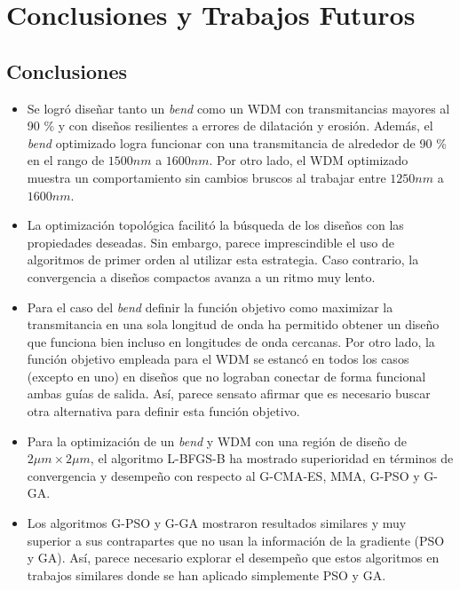 \chapter{Conclusiones y Trabajos Futuros}\label{chapter:conclutions}

\section{Conclusiones}

\begin{itemize}

  \item Se logró diseñar tanto un \emph{bend} como un WDM con transmitancias mayores al 90 \% y
        con diseños resilientes a errores de dilatación y erosión.
        Además, el \emph{bend} optimizado logra funcionar con una transmitancia de alrededor de 90 \%
        en el rango de $1500nm$ a $1600 nm$. Por otro lado, el WDM optimizado muestra un comportamiento
        sin cambios bruscos al trabajar entre $1250 nm$ a $1600 nm$.

  \item La optimización topológica facilitó la búsqueda de los diseños con las propiedades deseadas.
        Sin embargo, parece imprescindible el uso de algoritmos de primer orden al utilizar
        esta estrategia. Caso contrario, la convergencia a diseños compactos avanza a un ritmo muy lento.

  \item Para el caso del \emph{bend} definir la función objetivo como maximizar la transmitancia en una
        sola longitud de onda ha permitido obtener un diseño que funciona bien incluso en longitudes de
        onda cercanas. Por otro lado, la función objetivo empleada para el WDM se estancó en todos los
        casos (excepto en uno) en diseños que no lograban conectar de forma funcional ambas guías de salida.
        Así, parece sensato afirmar que es necesario buscar otra alternativa para definir esta función
objetivo.

  \item Para la optimización de un \emph{bend} y WDM con una región de diseño de $2 \mu m \times 2 \mu m$,
        el algoritmo L-BFGS-B ha mostrado superioridad en términos de convergencia y desempeño con respecto
        al G-CMA-ES, MMA, G-PSO y G-GA. 

  \item Los algoritmos G-PSO y G-GA mostraron resultados similares y muy superior a sus contrapartes que no
        usan la información de la gradiente (PSO y GA).
        Así, parece necesario explorar el desempeño que estos algoritmos en trabajos similares
        donde se han aplicado simplemente PSO y GA.


\end{itemize}
